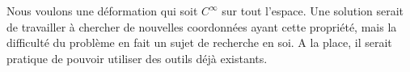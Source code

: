 Nous voulons une déformation qui soit $C^{\infty}$ sur tout l'espace. Une
solution serait de travailler à chercher de nouvelles coordonnées ayant cette
propriété, mais la difficulté du problème en fait un sujet de recherche en
soi. A la place, il serait pratique de pouvoir utiliser des outils déjà
existants. 






